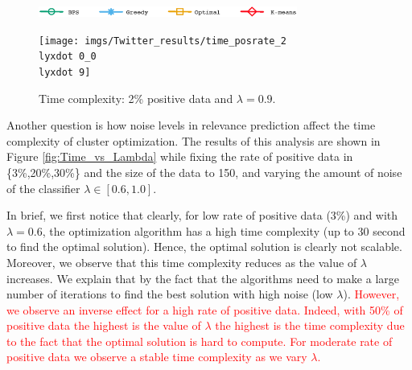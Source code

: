 


\begin{figure}[H]
\begin{centering}
\includegraphics[width=8.5cm]{imgs/legend2}
\par\end{centering}
\begin{centering}
{\texttt{[image: imgs/Twitter\_results/time\_posrate\_2\\lyxdot 0\_0\\lyxdot 9]}}
\par\end{centering}
\caption{Time complexity: 2\% positive data and  $\lambda=0.9$.}
\label{fig:Time_vs_Data}
\end{figure}



  Another question is how noise levels in relevance prediction affect the time complexity of cluster optimization.  The results of this analysis are shown in Figure \ref{fig:Time_vs_Lambda} while fixing the rate of positive data in  \{3\%,20\%,30\%\} and the size of the data to 150, and varying the amount of noise of the classifier $\lambda \in [0.6,1.0]$.

In brief, we first notice that clearly, for low rate of positive data (3\%) and with $\lambda=0.6$, the optimization algorithm has a high time complexity (up to 30 second to find the optimal solution). Hence, the optimal solution is clearly not scalable. Moreover, we observe that this time complexity reduces as the value of $\lambda$ increases. We explain that by the fact that the algorithms need to make a large number of iterations to find the best solution with high noise (low $\lambda$). \textcolor{red}{However, we observe an inverse effect for a high rate of positive data. Indeed, with 50\% of positive data the highest is the value of $\lambda$ the highest is the time complexity due to the fact that the optimal solution is hard to compute. For moderate rate of positive data we observe a stable time complexity as we vary  $\lambda$.}



